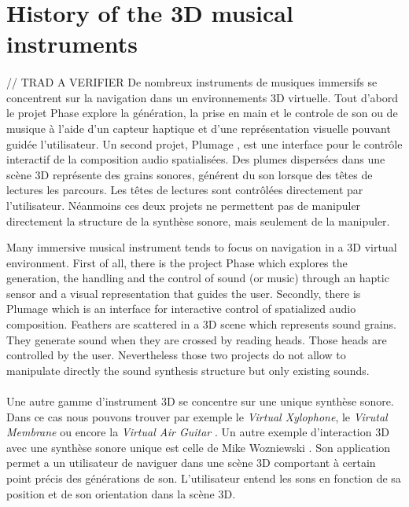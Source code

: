 \section{History of the 3D musical instruments}
\paragraph{}
// TRAD A VERIFIER
De nombreux instruments de musiques immersifs se concentrent sur la navigation dans un environnements 3D virtuelle.
Tout d'abord le projet Phase \cite{rodet2005study} explore la génération, la prise en main et le controle de son ou de musique à l'aide d'un capteur haptique et d'une représentation visuelle pouvant guidée l'utilisateur.
Un second projet, Plumage \cite{plumage2007}, est une interface pour le contrôle interactif de la composition audio spatialisées. Des plumes dispersées dans une scène 3D représente des grains sonores, générent du son lorsque des têtes de lectures les parcours. Les têtes de lectures sont contrôlées directement par l'utilisateur.
Néanmoins ces deux projets ne permettent pas de manipuler directement la structure de la synthèse sonore, mais seulement de la manipuler.

Many immersive musical instrument tends to focus on navigation in a 3D virtual environment.
First of all, there is the project Phase \cite{rodet2005study} which explores the generation, the handling and the control of sound (or music) through an haptic sensor and a visual representation that guides the user.
Secondly, there is Plumage \cite{plumage2007} which is an interface for interactive control of spatialized audio composition. Feathers are scattered in a 3D scene which represents sound grains. They generate sound when they are crossed by reading heads. Those heads are controlled by the user.
Nevertheless those two projects do not allow to manipulate directly the sound synthesis structure but only existing sounds. 

\paragraph{}
Une autre gamme d'instrument 3D se concentre sur une unique synthèse sonore. Dans ce cas nous pouvons trouver par exemple le \textit{Virtual Xylophone}, le \textit{Virutal Membrane} ou encore la \textit{Virtual Air Guitar} \cite{maki2005}. Un autre exemple d'interaction 3D avec une synthèse sonore unique est celle de Mike Wozniewski \cite{wozniewski2006spatial}. Son application permet a un utilisateur de naviguer dans une scène 3D comportant à certain point précis des générations de son. L'utilisateur entend les sons en fonction de sa position et de son orientation dans la scène 3D.

